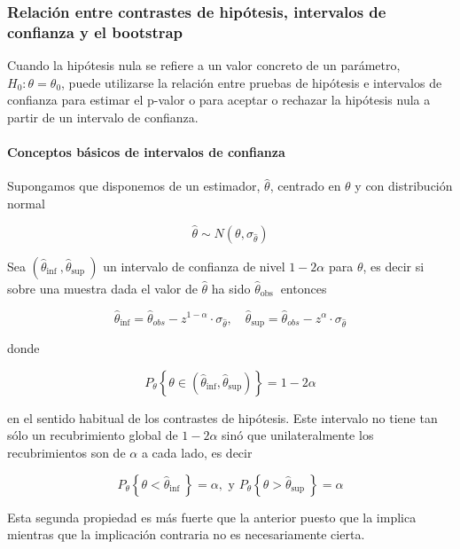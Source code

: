 \documentclass[
]{article}
\begin{document}
\subsubsection{Relación entre contrastes de hipótesis, intervalos de confianza y el bootstrap}\label{relaciuxf3n-entre-contrastes-de-hipuxf3tesis-intervalos-de-confianza-y-el-bootstrap}

Cuando la hipótesis nula se refiere a un valor concreto de un parámetro, \(H_{0}: \theta=\theta_{0}\), puede utilizarse la relación entre pruebas de hipótesis e intervalos de confianza para estimar el p-valor o para aceptar o rechazar la hipótesis nula a partir de un intervalo de confianza.

\paragraph{Conceptos básicos de intervalos de confianza}\label{conceptos-buxe1sicos-de-intervalos-de-confianza}

Supongamos que disponemos de un estimador, \(\hat{\theta}\), centrado en \(\theta\) y con distribución normal

\[
\hat{\theta} \sim N\left(\theta, \sigma_{\hat{\theta}}\right)
\]

Sea \(\left(\hat{\theta}_{\text {inf }}, \hat{\theta}_{\text {sup }}\right)\) un intervalo de confianza de nivel \(1-2 \alpha\) para \(\theta\), es decir si sobre una muestra dada el valor de \(\hat{\theta}\) ha sido \(\hat{\theta}_{\text {obs }}\) entonces

\[
\hat{\theta}_{\mathrm{inf}}=\hat{\theta}_{o b s}-z^{1-\alpha} \cdot \sigma_{\hat{\theta}}, \quad \hat{\theta}_{\mathrm{sup}}=\hat{\theta}_{o b s}-z^{\alpha} \cdot \sigma_{\hat{\theta}}
\]

donde

\[
P_{\theta}\left\{\theta \in\left(\hat{\theta}_{\mathrm{inf}}, \hat{\theta}_{\mathrm{sup}}\right)\right\}=1-2 \alpha
\]

en el sentido habitual de los contrastes de hipótesis. Este intervalo no tiene tan sólo un recubrimiento global de \(1-2 \alpha\) sinó que unilateralmente los recubrimientos son de \(\alpha\) a cada lado, es decir

\[
P_{\theta}\left\{\theta<\hat{\theta}_{\text {inf }}\right\}=\alpha, \text { y } P_{\theta}\left\{\theta>\hat{\theta}_{\text {sup }}\right\}=\alpha
\]

Esta segunda propiedad es más fuerte que la anterior puesto que la implica mientras que la implicación contraria no es necesariamente cierta.
\end{document}
